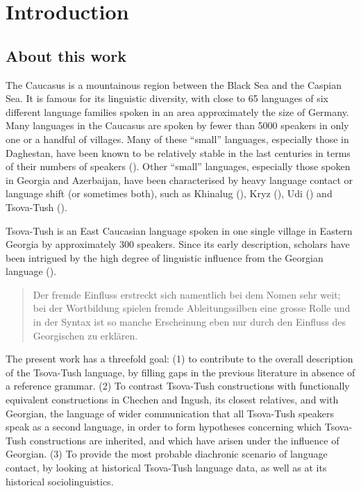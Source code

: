 \chapter{Introduction} \label{introduction}
\section{About this work}


The Caucasus is a mountainous region between the Black Sea and the Caspian Sea. It is famous for its linguistic diversity, with close to 65 languages of six different language families spoken in an area approximately the size of Germany. Many languages in the Caucasus are spoken by fewer than 5000 speakers in only one or a handful of villages. Many of these “small” languages, especially those in Daghestan, have been known to be relatively stable in the last centuries in terms of their numbers of speakers (\cite[523]{daniel2021franca}). Other “small” languages, especially those spoken in Georgia and Azerbaijan, have been characterised by heavy language contact or language shift (or sometimes both), such as Khinalug (\cite{rindpawlow2023khinaluginfluence}), Kryz (\cite[]{authier2010kryzcopy}), Udi (\cite[]{gippert08}) and Tsova-Tush (\cite{WS}).

Tsova-Tush is an East Caucasian language spoken in one single village in Eastern Georgia by approximately 300 speakers. Since its early description, scholars have been intrigued by the high degree of linguistic influence from the Georgian language (\cites[4]{schiefner56}).

\begin{quote}
	Der fremde Einfluss erstreckt sich namentlich bei dem Nomen sehr weit; bei der Wortbildung spielen fremde Ableitungssilben eine grosse Rolle und in der Syntax ist so manche Erscheinung eben nur durch den Einfluss des Georgischen zu erklären.\medskip\\ 
\end{quote}

The present work has a threefold goal: (1) to contribute to the overall description of the Tsova-Tush language, by filling gaps in the previous literature in absence of a reference grammar. (2) To contrast Tsova-Tush constructions with functionally equivalent constructions in Chechen and Ingush, its closest relatives, and with Georgian, the language of wider communication that all Tsova-Tush speakers speak as a second language, in order to form hypotheses concerning which Tsova-Tush constructions are inherited, and which have arisen under the influence of Georgian. (3) To provide the most probable diachronic scenario of language contact, by looking at historical Tsova-Tush language data, as well as at its historical sociolinguistics. 

